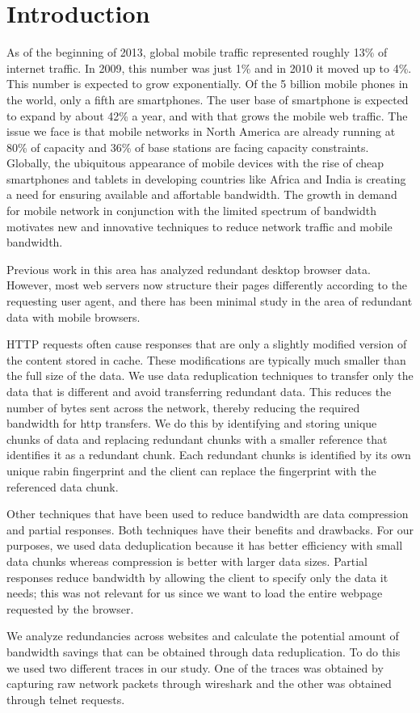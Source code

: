 \section{Introduction}
As of the beginning of 2013, global mobile traffic represented roughly 13\% of internet traffic.
In 2009, this number was just 1\% and in 2010 it moved up to 4\%.
This number is expected to grow exponentially. Of the 5 billion mobile phones in the world, only a fifth are smartphones. The user base of smartphone is expected to expand by about 42\% a year, and with that grows the mobile web traffic. 
The issue we face is that mobile networks in North America are already running at 80\% of capacity and 36\% of base stations are facing capacity constraints. Globally, the ubiquitous appearance of mobile devices with the rise of cheap smartphones and tablets in developing countries like Africa and India is creating a need for ensuring available and affortable bandwidth. The growth in demand for mobile network in conjunction with the limited spectrum of bandwidth motivates new and innovative techniques to reduce network traffic and mobile bandwidth. 

Previous work in this area has analyzed redundant desktop browser data. However, most web servers now structure their pages differently according to the requesting user agent, and there has been minimal study in the area of redundant data with mobile browsers.

HTTP requests often cause responses that are only a slightly modified version of the content stored in cache. These modifications are typically much smaller than the full size of the data.  We use data reduplication techniques to transfer only the data that is different and avoid transferring redundant data. This reduces the number of bytes sent across the network, thereby reducing the required bandwidth for http transfers. We do this by identifying and storing unique chunks of data and replacing redundant chunks with a smaller reference that identifies it as a redundant chunk. Each redundant chunks is identified by its own unique rabin fingerprint and the client can replace the fingerprint with the referenced data chunk. 

Other techniques that have been used to reduce bandwidth are data compression and partial responses. Both techniques have their benefits and drawbacks. For our purposes, we used data deduplication because it has better efficiency with small data chunks whereas compression is better with larger data sizes. Partial responses reduce bandwidth by allowing the client to specify only the data it needs; this was not relevant for us since we want to load the entire webpage requested by the browser.

We analyze redundancies across websites and calculate the potential amount of bandwidth savings that can be obtained through data reduplication. To do this we used two different traces in our study. One of the traces was obtained by capturing raw network packets through wireshark and the other was obtained through telnet requests. 






